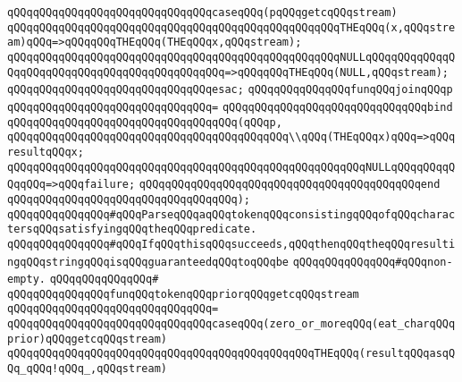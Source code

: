 \verb|qQQqqQQqqQQqqQQqqQQqqQQqqQQqqQQqcaseqQQq(pqQQqgetcqQQqstream)|\newline
\verb|qQQqqQQqqQQqqQQqqQQqqQQqqQQqqQQqqQQqqQQqqQQqqQQqqQQqTHEqQQq(x,qQQqstream)qQQq=>qQQqqQQqTHEqQQq(THEqQQqx,qQQqstream);|\newline
\verb|qQQqqQQqqQQqqQQqqQQqqQQqqQQqqQQqqQQqqQQqqQQqqQQqqQQqNULLqQQqqQQqqQQqqQQqqQQqqQQqqQQqqQQqqQQqqQQqqQQqqQQq=>qQQqqQQqTHEqQQq(NULL,qQQqstream);|\newline
\verb|qQQqqQQqqQQqqQQqqQQqqQQqqQQqqQQqesac;|\newline
\newline
\newline
\verb|qQQqqQQqqQQqqQQqfunqQQqjoinqQQqp|\newline
\verb|qQQqqQQqqQQqqQQqqQQqqQQqqQQqqQQq=|\newline
\verb|qQQqqQQqqQQqqQQqqQQqqQQqqQQqqQQqbind|\newline
\verb|qQQqqQQqqQQqqQQqqQQqqQQqqQQqqQQqqQQq(qQQqp,|\newline
\verb|qQQqqQQqqQQqqQQqqQQqqQQqqQQqqQQqqQQqqQQqqQQq\\qQQq(THEqQQqx)qQQq=>qQQqresultqQQqx;|\newline
\verb|qQQqqQQqqQQqqQQqqQQqqQQqqQQqqQQqqQQqqQQqqQQqqQQqqQQqqQQqNULLqQQqqQQqqQQqqQQq=>qQQqfailure;|\newline
\verb|qQQqqQQqqQQqqQQqqQQqqQQqqQQqqQQqqQQqqQQqqQQqend|\newline
\verb|qQQqqQQqqQQqqQQqqQQqqQQqqQQqqQQqqQQq);|\newline
\newline
\newline
\verb|qQQqqQQqqQQqqQQq#qQQqParseqQQqaqQQqtokenqQQqconsistingqQQqofqQQqcharactersqQQqsatisfyingqQQqtheqQQqpredicate.|\newline
\verb|qQQqqQQqqQQqqQQq#qQQqIfqQQqthisqQQqsucceeds,qQQqthenqQQqtheqQQqresultingqQQqstringqQQqisqQQqguaranteedqQQqtoqQQqbe|\newline
\verb|qQQqqQQqqQQqqQQq#qQQqnon-empty.|\newline
\verb|qQQqqQQqqQQqqQQq#|\newline
\verb|qQQqqQQqqQQqqQQqfunqQQqtokenqQQqpriorqQQqgetcqQQqstream|\newline
\verb|qQQqqQQqqQQqqQQqqQQqqQQqqQQqqQQq=|\newline
\verb|qQQqqQQqqQQqqQQqqQQqqQQqqQQqqQQqcaseqQQq(zero_or_moreqQQq(eat_charqQQqprior)qQQqgetcqQQqstream)|\newline
\newline
\verb|qQQqqQQqqQQqqQQqqQQqqQQqqQQqqQQqqQQqqQQqqQQqqQQqTHEqQQq(resultqQQqasqQQq_qQQq!qQQq_,qQQqstream)|\newline
